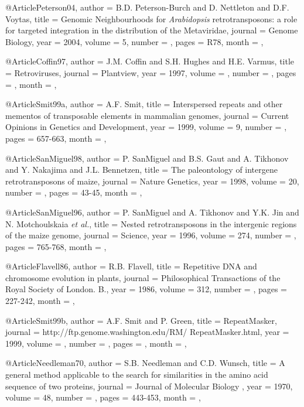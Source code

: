 @Article{Peterson04,
  author = 	 {B.D. Peterson-Burch and D. Nettleton and D.F. Voytas},
  title = 	 {{Genomic Neighbourhoods for {\it Arabidopsis} retrotransposons: a role for targeted integration in the distribution of the Metaviridae}},
  journal =  {Genome Biology},
  year = 	 {2004},
  volume = 	 {5},
  number = 	 {},
  pages = 	 {R78},
  month = 	 {},
}

@Article{Coffin97,
  author = 	 {J.M. Coffin and S.H. Hughes and H.E. Varmus},
  title = 	 {Retroviruses},
  journal =  {Plantview},
  year = 	 {1997},
  volume = 	 {},
  number = 	 {},
  pages = 	 {},
  month = 	 {},
}

@Article{Smit99a,
  author = 	 {A.F. Smit},
  title = 	 {Interspersed repeats and other mementos of transposable elements in mammalian genomes},
  journal =  {Current Opinions in Genetics and Development},
  year = 	 {1999},
  volume = 	 {9},
  number = 	 {},
  pages = 	 {657-663},
  month = 	 {},
}

@Article{SanMiguel98,
  author = 	 {P. SanMiguel and B.S. Gaut and A. Tikhonov and Y. Nakajima and J.L. Bennetzen},
  title = 	 {The paleontology of intergene retrotransposons of maize},
  journal =  {Nature Genetics},
  year = 	 {1998},
  volume = 	 {20},
  number = 	 {},
  pages = 	 {43-45},
  month = 	 {},
}

@Article{SanMiguel96,
  author = {P. SanMiguel and A. Tikhonov and Y.K. Jin and N. Motchoulskaia {\it et al.}},
  title = 	 {Nested retrotransposons in the intergenic regions of the maize genome},
  journal =  {Science},
  year = 	 {1996},
  volume = 	 {274},
  number = 	 {},
  pages = 	 {765-768},
  month = 	 {},
}

@Article{Flavell86,
  author = 	 {R.B. Flavell},
  title = 	 {{Repetitive DNA and chromosome evolution in plants}},
  journal =  {{Philosophical Transactions of the Royal Society of London. B.}},
  year = 	 {1986},
  volume = 	 {312},
  number = 	 {},
  pages = 	 {227-242},
  month = 	 {},
}


@Article{Smit99b,
  author = 	 {A.F. Smit and P. Green},
  title = 	 {{RepeatMasker}},
  journal =  {http://ftp.genome.washington.edu/RM/ RepeatMasker.html},
  year = 	 {1999},
  volume = 	 {},
  number = 	 {},
  pages = 	 {},
  month = 	 {},
}

@Article{Needleman70,
  author = 	 {S.B. Needleman and C.D. Wunsch},
  title = 	 {A general method applicable to the search for similarities in the amino acid sequence of two proteins},
  journal =  {Journal of Molecular Biology} ,
  year = 	 {1970},
  volume = 	 {48},
  number = 	 {},
  pages = 	 {443-453},
  month = 	 {},
}



